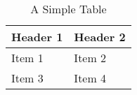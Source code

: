 \begin{table}[h]
  \centering
  \begin{tabular}{|l|l|}
    \hline
    \textbf{Header 1} & \textbf{Header 2} \\
    \hline
    Item 1            & Item 2            \\
    Item 3            & Item 4            \\
    \hline
  \end{tabular}
  \caption{A Simple Table}
  \label{table:1} %
\end{table}

